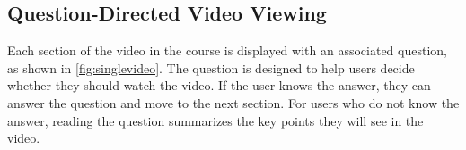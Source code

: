 \documentclass{sigchi}
\begin{document}
\subsection{Question-Directed Video Viewing}

Each section of the video in the course is displayed with an associated question, as shown in 
\autoref{fig:singlevideo}. The question is designed to help users decide whether they should watch the video. If the user knows the answer, they can answer the question and move to the next section. For users who do not  know the answer, reading the question summarizes the key points they will see in the video.



\end{document}
